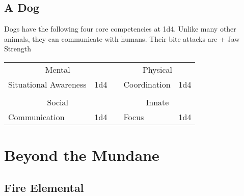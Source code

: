 \documentclass{LegrandOrangeTufteBook}
\begin{document}
\subsection*{A Dog}
Dogs have the following four core competencies at 1d4.
Unlike many other animals, they can communicate with humans.
Their bite attacks are  + Jaw Strength\\
\begin{characterSheet}
	\begin{tabular}{lr|clr|}
		\multicolumn{2}{c}{Mental}	&&	\multicolumn{2}{c}{Physical} \\
		\cline{1-2} \cline{4-5}
		Situational Awareness & 1d4				&& 	Coordination & 1d4 \\
		\multicolumn{4}{c}{} \\
		\multicolumn{2}{c}{Social}	&&	\multicolumn{2}{c}{Innate} \\
		\cline{1-2} \cline{4-5}
		Communication & 1d4 			&&	Focus & 1d4 \\
	\end{tabular}
\end{characterSheet}


\section*{Beyond the Mundane}

\subsection*{Fire Elemental}
\label{subsec:fire_elemental}
\end{document}
